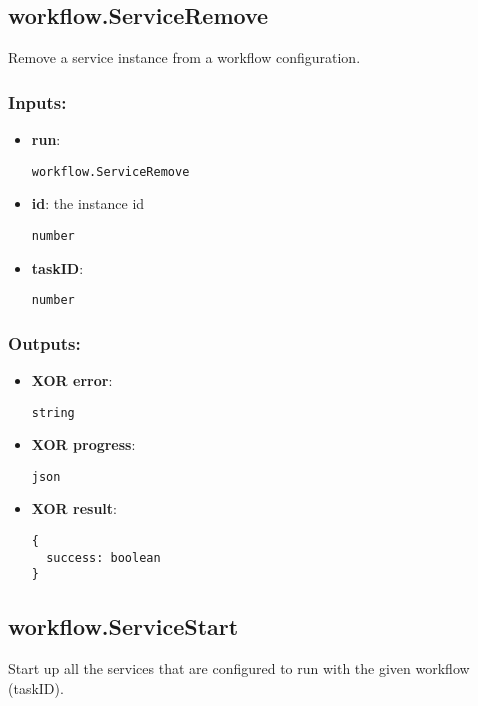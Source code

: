 \subsection{workflow.ServiceRemove}
\label{ch:builtinservices:workflow.ServiceRemove}
Remove a service instance from a workflow configuration.
\subsubsection*{Inputs:}
\begin{itemize}
    \item \textbf{run}: 
\begin{lstlisting}
workflow.ServiceRemove
\end{lstlisting}
    \item \textbf{id}: the instance id
\begin{lstlisting}
number
\end{lstlisting}
    \item \textbf{taskID}: 
\begin{lstlisting}
number
\end{lstlisting}
  \end{itemize}

\subsubsection*{Outputs:}
\begin{itemize}
    \item \textbf{XOR error}: 
\begin{lstlisting}
string
\end{lstlisting}
    \item \textbf{XOR progress}: 
\begin{lstlisting}
json
\end{lstlisting}
    \item \textbf{XOR result}: 
\begin{lstlisting}
{
  success: boolean
}
\end{lstlisting}
  \end{itemize}

\subsection{workflow.ServiceStart}
\label{ch:builtinservices:workflow.ServiceStart}
Start up all the services that are configured to run with the given workflow (taskID).
